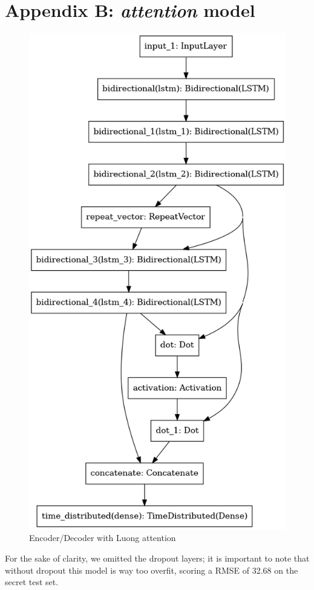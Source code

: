 \documentclass[10.5pt,a4paper,twocolumn]{article}
\begin{document}
\section*{Appendix B: \textit{attention} model}
\begin{figure}[h]
    \centering
    \includegraphics[width=0.8\linewidth]{pics/attention_model.png}
    \caption{Encoder/Decoder with Luong attention}
\end{figure}
For the sake of clarity, we omitted the dropout layers; it is
important to note that without dropout this model is way too overfit, scoring a RMSE of 32.68 on the 
secret test set.
\end{document}

